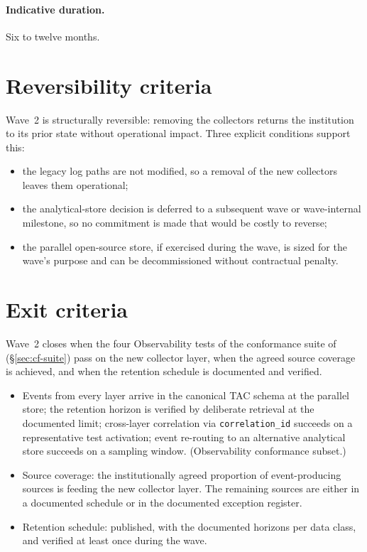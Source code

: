 \paragraph{Indicative duration.} Six to twelve months.

\section{Reversibility criteria}
\label{sec:w2-reversibility}

Wave~2 is structurally reversible: removing the collectors
returns the institution to its prior state without operational
impact. Three explicit conditions support this:

\begin{itemize}[leftmargin=1.5em,nosep]
  \item the legacy log paths are not modified, so a removal of the
    new collectors leaves them operational;
  \item the analytical-store decision is deferred to a subsequent
    wave or wave-internal milestone, so no commitment is made
    that would be costly to reverse;
  \item the parallel open-source store, if exercised during the
    wave, is sized for the wave's purpose and can be decommissioned
    without contractual penalty.
\end{itemize}

\section{Exit criteria}
\label{sec:w2-exit}

Wave~2 closes when the four Observability tests of the conformance
suite of  (\S\ref{sec:cf-suite}) pass on
the new collector layer, when the agreed source coverage is
achieved, and when the retention schedule is documented and
verified.

\begin{itemize}[leftmargin=1.5em,nosep]
  \item Events from every layer arrive in the canonical TAC schema
    at the parallel store; the retention horizon is verified by
    deliberate retrieval at the documented limit; cross-layer
    correlation via \texttt{correlation\_id} succeeds on a
    representative test activation; event re-routing to an
    alternative analytical store succeeds on a sampling window.
    (Observability conformance subset.)
  \item Source coverage: the institutionally agreed proportion of
    event-producing sources is feeding the new collector layer.
    The remaining sources are either in a documented schedule or
    in the documented exception register.
  \item Retention schedule: published, with the documented horizons
    per data class, and verified at least once during the wave.
\end{itemize}

